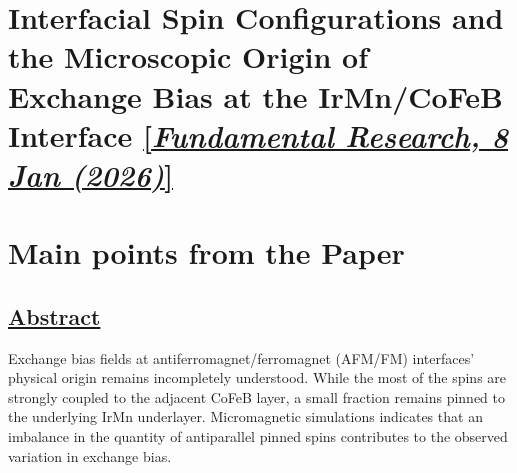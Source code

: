 \section{Interfacial Spin Configurations and the Microscopic Origin of Exchange Bias at the IrMn/CoFeB Interface \href{https://doi.org/10.1016/j.fmre.2026.01.003}{[\textit{Fundamental Research, 8 Jan (2026)}]}}

\section*{Main points from the Paper}
\subsection*{\centering\underline{Abstract}}
\hspace{3cm} Exchange bias fields at antiferromagnet/ferromagnet (AFM/FM) interfaces' physical origin remains incompletely understood. While the most of the spins are strongly coupled to the adjacent CoFeB layer, a small fraction remains pinned to the underlying IrMn underlayer. Micromagnetic simulations indicates that an imbalance in the quantity of antiparallel pinned spins contributes to the observed variation in exchange bias.

